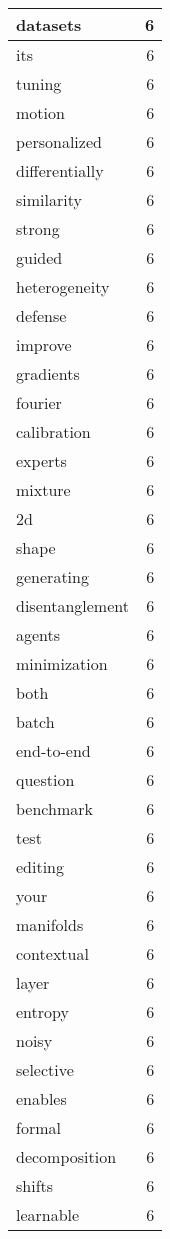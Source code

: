 \begin{table}[h]
\begin{tabular}{|l|r|}
\hline
datasets & 6 \\
\hline
its & 6 \\
\hline
tuning & 6 \\
\hline
motion & 6 \\
\hline
personalized & 6 \\
\hline
differentially & 6 \\
\hline
similarity & 6 \\
\hline
strong & 6 \\
\hline
guided & 6 \\
\hline
heterogeneity & 6 \\
\hline
defense & 6 \\
\hline
improve & 6 \\
\hline
gradients & 6 \\
\hline
fourier & 6 \\
\hline
calibration & 6 \\
\hline
experts & 6 \\
\hline
mixture & 6 \\
\hline
2d & 6 \\
\hline
shape & 6 \\
\hline
generating & 6 \\
\hline
disentanglement & 6 \\
\hline
agents & 6 \\
\hline
minimization & 6 \\
\hline
both & 6 \\
\hline
batch & 6 \\
\hline
end-to-end & 6 \\
\hline
question & 6 \\
\hline
benchmark & 6 \\
\hline
test & 6 \\
\hline
editing & 6 \\
\hline
your & 6 \\
\hline
manifolds & 6 \\
\hline
contextual & 6 \\
\hline
layer & 6 \\
\hline
entropy & 6 \\
\hline
noisy & 6 \\
\hline
selective & 6 \\
\hline
enables & 6 \\
\hline
formal & 6 \\
\hline
decomposition & 6 \\
\hline
shifts & 6 \\
\hline
learnable & 6 \\

\end{tabular}
\end{table}
